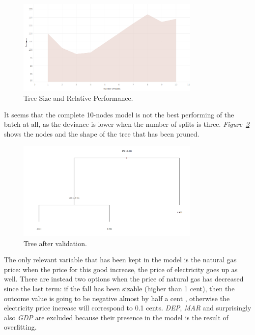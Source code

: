 \documentclass[a4paper,12pt]{book}
\begin{document}
\begin{figure}[tb]
\begin{center}
\captionsetup{justification=centering}
\includegraphics[width=0.8\textwidth]{Images/tre.png}
\caption{Tree Size and Relative Performance.}
\label{fig:tre}
\end{center}
\end{figure}

It seems that the complete 10-nodes model is not the best performing of the batch at all, as the deviance is lower when the number of splits is three. \textit{Figure~\ref{fig:trep}} shows the nodes and the shape of the tree that has been pruned.

\begin{figure}[tb]
\begin{center}
\captionsetup{justification=centering}
\includegraphics[width=0.8\textwidth]{Images/trep.png}
\caption{Tree after validation.}
\label{fig:trep}
\end{center}
\end{figure}

The only relevant variable that has been kept in the model is the natural gas price: when the price for this good increase, the price of electricity goes up as well. There are instead two options when the price of natural gas has decreased since the last term: if the fall has been sizable (higher than 1 cent), then the outcome value is going to be negative almost by half a cent , otherwise the electricity price increase will correspond to 0.1 cents. \textit{DEP}, \textit{MAR} and surprisingly also \textit{GDP} are excluded because their presence in the model is the result of overfitting.
\end{document}
